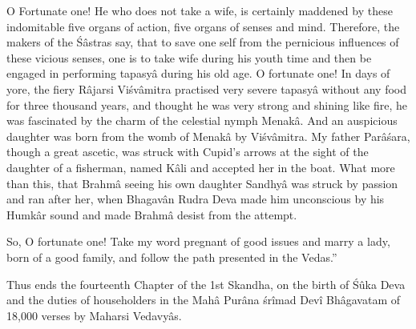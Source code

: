 O Fortunate one! He who does not take a wife, is certainly maddened by these indomitable five organs of action, five organs of senses and mind. Therefore, the makers of the \'S\^astras say, that to save one self from the pernicious influences of these vicious senses, one is to take wife during his youth time and then be engaged in performing tapasy\^a during his old age. O fortunate one! In days of yore, the fiery R\^ajarsi Vi\'sv\^amitra practised very severe tapasy\^a without any food for three thousand years, and thought he was very strong and shining like fire, he was fascinated by the charm of the celestial nymph Menak\^a. And an auspicious daughter was born from the womb of Menak\^a by Vi\'sv\^amitra. My father Par\^a\'sara, though a great ascetic, was struck with Cupid's arrows at the sight of the daughter of a fisherman, named K\^ali and accepted her in the boat. What more than this, that Brahm\^a seeing his  own daughter Sandhy\^a was struck by passion and ran after her, when Bhagav\^an Rudra Deva made him unconscious by his Humk\^ar sound and made Brahm\^a desist from the attempt.

So, O fortunate one! Take my word pregnant of good issues and marry a lady, born of a good family, and follow the path presented in the Vedas.''

Thus ends the fourteenth Chapter of the 1st Skandha, on the birth of \'S\^uka Deva and the duties of householders in the Mah\^a Pur\^ana \'sr\^imad Dev\^i Bh\^agavatam of 18,000 verses by Maharsi Vedavy\^as.

